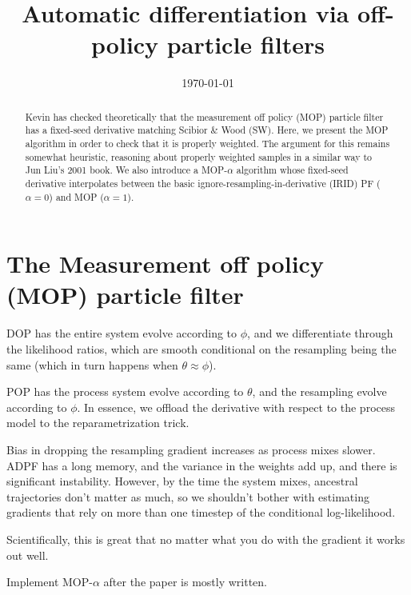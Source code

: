 \documentclass[12p]{article}
\begin{document}
\title{Automatic differentiation via off-policy particle filters}
\date{\today}
\maketitle

\begin{abstract}
Kevin has checked theoretically that the measurement off policy (MOP) particle filter has a fixed-seed derivative matching Scibior \& Wood (SW). 
Here, we present the MOP algorithm in order to check that it is properly weighted.
The argument for this remains somewhat heuristic, reasoning about properly weighted samples in a similar way to Jun Liu's 2001 book.
We also introduce a MOP-$\alpha$ algorithm whose fixed-seed derivative interpolates between the basic ignore-resampling-in-derivative (IRID) PF ($\alpha=0$) and 
MOP ($\alpha=1$).
\end{abstract}

\section{The Measurement off policy (MOP) particle filter}

DOP has the entire system evolve according to $\phi$, and we differentiate through the likelihood ratios, which are smooth conditional on the resampling being the same (which in turn happens when $\theta \approx \phi$). 

POP has the process system evolve according to $\theta$, and the resampling evolve according to $\phi$. In essence, we offload the derivative with respect to the process model to the reparametrization trick. 

Bias in dropping the resampling gradient increases as process mixes slower. ADPF has a long memory, and the variance in the weights add up, and there is significant instability. However, by the time the system mixes, ancestral trajectories don't matter as much, so we shouldn't bother with estimating gradients that rely on more than one timestep of the conditional log-likelihood. 

Scientifically, this is great that no matter what you do with the gradient it works out well. 

Implement MOP-$\alpha$ after the paper is mostly written. 
\end{document}
